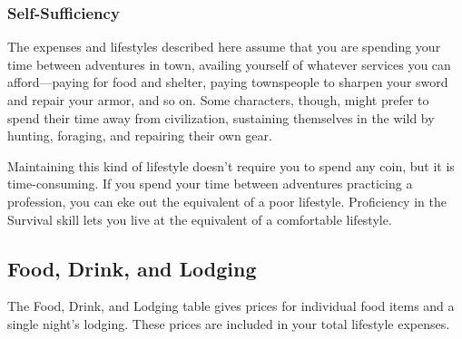 \subsubsection{Self-Sufficiency}

The expenses and lifestyles described here assume that you are spending your time between adventures in town, availing yourself of whatever services you can afford—paying for food and shelter, paying townspeople to sharpen your sword and repair your armor, and so on. Some characters, though, might prefer to spend their time away from civilization, sustaining themselves in the wild by hunting, foraging, and repairing their own gear.

Maintaining this kind of lifestyle doesn't require you to spend any coin, but it is time-consuming. If you spend your time between adventures practicing a profession, you can eke out the equivalent of a poor lifestyle. Proficiency in the Survival skill lets you live at the equivalent of a comfortable lifestyle.

\subsection{Food, Drink, and Lodging}

The Food, Drink, and Lodging table gives prices for individual food items and a single night's lodging. These prices are included in your total lifestyle expenses.

